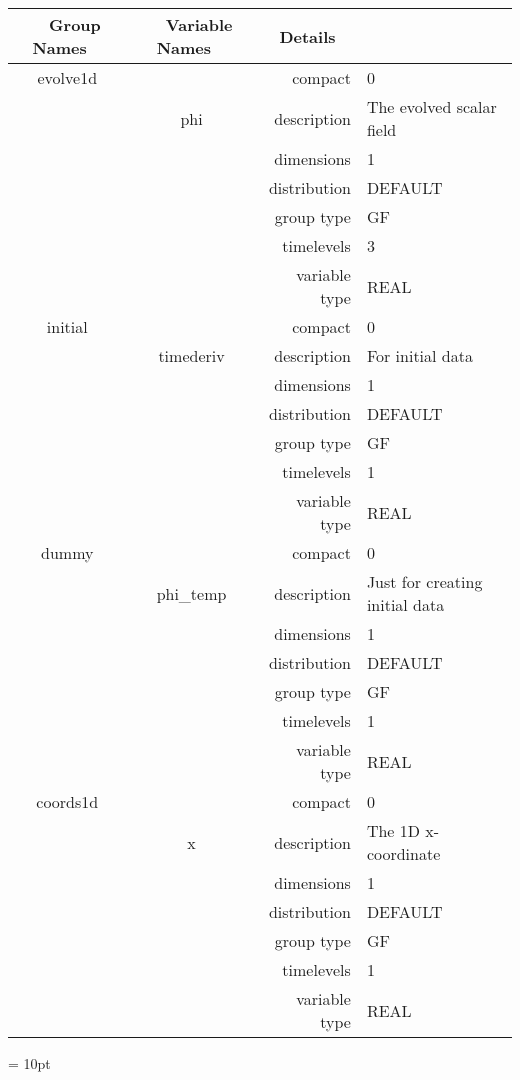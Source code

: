 \begin{tabular*}{150mm}{|c|c@{\extracolsep{\fill}}|rl|} \hline 
~ {\bf Group Names} ~ & ~ {\bf Variable Names} ~  &{\bf Details} ~ & ~\\ 
\hline 
evolve1d &  & compact & 0 \\ 
 & phi & description & The evolved scalar field \\ 
 &  & dimensions & 1 \\ 
 &  & distribution & DEFAULT \\ 
 &  & group type & GF \\ 
 &  & timelevels & 3 \\ 
 &  & variable type & REAL \\ 
\hline 
initial &  & compact & 0 \\ 
 & timederiv & description & For initial data \\ 
 &  & dimensions & 1 \\ 
 &  & distribution & DEFAULT \\ 
 &  & group type & GF \\ 
 &  & timelevels & 1 \\ 
 &  & variable type & REAL \\ 
\hline 
dummy &  & compact & 0 \\ 
 & phi\_temp & description & Just for creating initial data \\ 
 &  & dimensions & 1 \\ 
 &  & distribution & DEFAULT \\ 
 &  & group type & GF \\ 
 &  & timelevels & 1 \\ 
 &  & variable type & REAL \\ 
\hline 
coords1d &  & compact & 0 \\ 
 & x & description & The 1D x-coordinate \\ 
 &  & dimensions & 1 \\ 
 &  & distribution & DEFAULT \\ 
 &  & group type & GF \\ 
 &  & timelevels & 1 \\ 
 &  & variable type & REAL \\ 
\hline 
\end{tabular*} 



\vspace{5mm}\parskip = 10pt 

